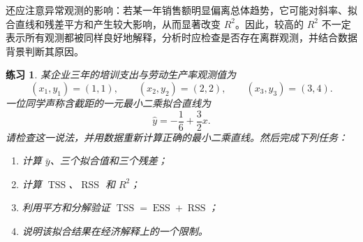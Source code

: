 \documentclass[UTF8,fontset=fandol,11pt]{ctexart}
\newtheorem{exercise}[definition]{练习}
\begin{document}
还应注意异常观测的影响：若某一年销售额明显偏离总体趋势，它可能对斜率、拟合直线和残差平方和产生较大影响，从而显著改变 $R^2$。因此，较高的 $R^2$ 不一定表示所有观测都被同样良好地解释，分析时应检查是否存在离群观测，并结合数据背景判断其原因。\par
\begin{exercise}
\label{mathagent:exercise:80c9d88bd59912a783f0955435a3f123c4b9f6c751a875a01f8d2dcd6b734e5e}
某企业三年的培训支出与劳动生产率观测值为
\[
(x_1,y_1)=(1,1),\qquad (x_2,y_2)=(2,2),\qquad (x_3,y_3)=(3,4).
\]
一位同学声称含截距的一元最小二乘拟合直线为
\[
\hat y=-\frac{1}{6}+\frac{3}{2}x.
\]
请检查这一说法，并用数据重新计算正确的最小二乘直线。然后完成下列任务：
\begin{enumerate}
\item 计算 $\bar y$、三个拟合值和三个残差；
\item 计算 $\operatorname{TSS}$、$\operatorname{RSS}$ 和 $R^2$；
\item 利用平方和分解验证 $\operatorname{TSS}=\operatorname{ESS}+\operatorname{RSS}$；
\item 说明该拟合结果在经济解释上的一个限制。
\end{enumerate}
\end{exercise}
\end{document}
